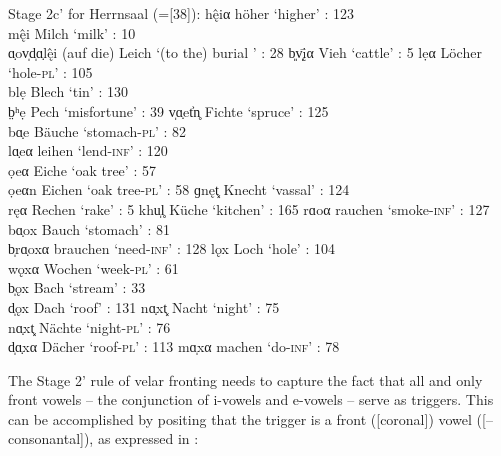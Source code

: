 \ea%
\label{ex:13:13}Stage 2c{}' for Herrnsaal (=[38]):
\ea\label{ex:13:13a} h\^{ę}iα \tab höher \tab ‘higher’ : 123\\
    m\^{ę}i \tab Milch \tab ‘milk’ : 10\\
    ɑ̣ov̩d̩ɑ̣l\^{ę}i \tab (auf die) Leich \tab ‘(to the) burial ’ : 28
\ex\label{ex:13:13b} b͈v̩\={\k{i}}α \tab Vieh \tab ‘cattle’ : 5
\ex\label{ex:13:13c} lẹα \tab Löcher \tab ‘hole-\textsc{pl}’ : 105\\
    blẹ \tab Blech \tab ‘tin’ : 130\\
    b̤ʰẹ \tab Pech \tab ‘misfortune’ : 39
\ex\label{ex:13:13d} v̩ɑ̣et͐n̥ \tab Fichte \tab ‘spruce’ : 125\\
    bɑ̣e \tab Bäuche \tab ‘stomach-\textsc{pl}' : 82\\
    lɑ̣eα \tab leihen \tab ‘lend-\textsc{inf}’ : 120\\
    ọeα \tab Eiche \tab ‘oak tree’ : 57\\
    ọeαn \tab Eichen \tab ‘oak tree-\textsc{pl}’ : 58
\ex\label{ex:13:13e} ɡnęt͓ \tab Knecht \tab ‘vassal’ : 124\\
    ręα \tab Rechen \tab ‘rake’ : 5
\ex\label{ex:13:13f} khu̩l̥ \tab Küche \tab ‘kitchen’ : 165
\ex\label{ex:13:13g} rɑoα \tab rauchen \tab ‘smoke-\textsc{inf}’ : 127\\
    bɑ̣ox \tab Bauch \tab ‘stomach’ : 81\\
    b̩rɑ̣oxα \tab brauchen \tab ‘need-\textsc{inf}’ : 128
\ex\label{ex:13:13h} lǫx \tab Loch \tab ‘hole’ : 104\\
    wǫxα \tab Wochen \tab ‘week-\textsc{pl}’ : 61\\
    b̩ǫx \tab Bach \tab ‘stream’ : 33\\
    d̩ǫx \tab Dach \tab ‘roof’ : 131
\ex\label{ex:13:13i} nɑ̣xt͓ \tab Nacht \tab ‘night’ : 75\\
    nɑ̣xt͓ \tab Nächte \tab ‘night-\textsc{pl}’ : 76\\
    d̩ɑ̣xα \tab Dächer \tab ‘roof-\textsc{pl}’ : 113
\ex\label{ex:13:13j} mɑ̩xα \tab machen \tab ‘do-\textsc{inf}’ : 78
\z
\z 

The Stage 2{}' rule of velar fronting needs to capture the fact that all and only front vowels -- the conjunction of i-vowels and e-vowels -- serve as triggers. This can be accomplished by positing that the trigger is a front ([coronal]) vowel \mbox{([--consonantal])}, as expressed in :

